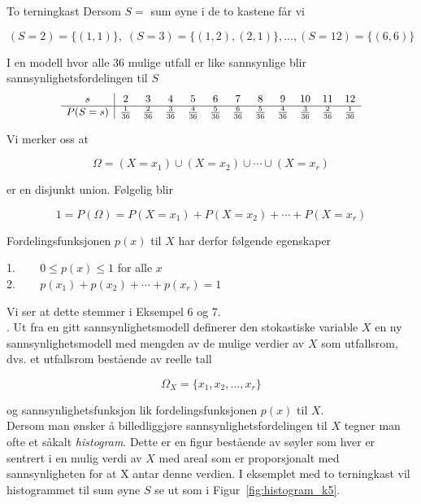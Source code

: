 \begin{eksempel}{To terningkast}
Dersom $S=$ sum øyne i de to kastene får vi

\[ (S=2)=\{(1,1)\},\; (S=3)=\{(1,2), (2,1)\}, \ldots , (S=12)=\{(6,6)\} \]

\noindent I en modell hvor alle 36 mulige utfall er like sannsynlige blir
sannsynlighetsfordelingen til $S$
\begin{displaymath}\small
\begin{array}{c|ccccccccccc} 
 s   &  2  &  3  &  4  &  5  &  6  &  7  &  8 & 9 & 10  &  11 & 12 \\ \hline
P(S=s)&\frac{1}{36}&\frac{2}{36}&\frac{3}{36}&\frac{4}{36}&\frac{5}{36}&
  \frac{6}{36}&\frac{5}{36}&\frac{4}{36}&\frac{3}{36}&\frac{2}{36}&\frac{1}{36}
  \end{array}
  \end{displaymath}
\end{eksempel}

\noindent Vi merker oss at

\[      \Omega = (X=x_1) \cup (X=x_2) \cup \cdots \cup (X=x_r) \]

\noindent er en disjunkt union. Følgelig blir

 \[      1=P(\Omega )=P(X=x_1)+P(X=x_2)+\cdots +P(X=x_r) \]

\noindent Fordelingsfunksjonen $p(x)$ til $X$ har derfor følgende
egenskaper
\begin{center}
 1. \mbox{\ \ \ }   $0 \leq p(x) \leq 1$ for alle $x$ \\
 2. \mbox{\ \ \ }   $p(x_1)+p(x_2)+ \cdots +p(x_r)=1$
\end{center}
\noindent Vi ser at dette stemmer i Eksempel 6 og 7. \\

. Ut fra en gitt sannsynlighetsmodell definerer den
stokastiske variable $X$ en ny sannsynlighetsmodell med mengden
av de mulige verdier av $X$ som utfallsrom, dvs. et utfallsrom
bestående av reelle tall

\[ \Omega _X =\{x_1, x_2, ..., x_r\} \]

\noindent og sannsynlighetsfunksjon lik fordelingsfunksjonen $p(x)$ til $X$.\\

Dersom man ønsker å billedliggjøre sannsynlighetsfordelingen til
$X$ tegner man ofte et såkalt {\em histogram}. Dette er en figur
bestående av søyler som hver er sentrert i en mulig verdi av $X$
med areal som er proporsjonalt med sannsynligheten for at X antar denne
 verdien. I eksemplet med to terningkast vil
histogrammet til sum øyne $S$ se ut som i Figur~\ref{fig:histogram_k5}.

